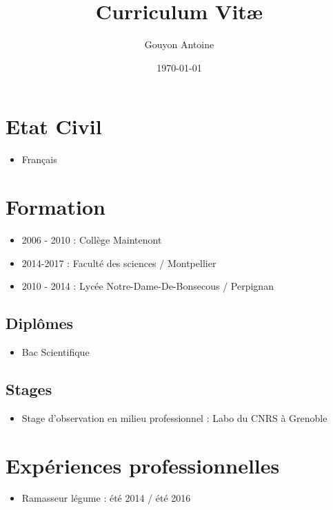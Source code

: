 \documentclass[a4paper]{article}
\title{Curriculum Vit\ae}
\author{Gouyon Antoine}
\date{\today}
\begin{document}
\maketitle

\section{\’Etat Civil}

\begin{itemize}
\item Français
\end{itemize}
\section{Formation}

\begin{itemize}
\item 2006 - 2010 : Collège Maintenont
\item 2014-2017 : Faculté des sciences / Montpellier
\item 2010 - 2014 : Lycée Notre-Dame-De-Bonsecous / Perpignan
\end{itemize}

\subsection{Diplômes}

\begin{itemize}
\item Bac Scientifique
\end{itemize}

\subsection{Stages}

\begin{itemize}
\item Stage d'observation en milieu professionnel : Labo du CNRS à Grenoble
\end{itemize}

\section{Expériences professionnelles}

\begin{itemize}
\item Ramasseur légume : été 2014 / été 2016
\end{itemize}
\end{document}
